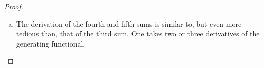 \begin{proof}
\begin{enumerate}[(a)]
{\noindent \emph{Alternate proof 3:} uses the generating functional
\begin{align}\label{eq:INTpowergenfnlexp}
e^{x}+e^{2x}+e^{3x}+\cdots+e^{nx}&=e^{x}\left(1+e^{x}+e^{2x}+e^{3x}+\cdots+e^{(n-1)x}
\right)
\notag\\
&=e^x\frac{e^{nx}-1}{e^x-1}\notag\\
&=\frac{e^{(n+1)x}-e^x}{e^x-1}
\end{align}
by \eqref{eq:INTgeomsum} with $r=e^x$. When we differentiate the
left hand side and then take the limit $x\rightarrow 0$ we get
\begin{align*}
\lim_{x\rightarrow 0}\diff{}{x}\big[e^{x}+e^{2x}+e^{3x}+\cdots+e^{nx}\big]
&=\lim_{x\rightarrow 0}\big[1e^{x}+2e^{2x}+3e^{3x}+\cdots+ne^{nx}\big] \\
&=1+2+3+\cdots+n
\end{align*}
which is exactly the sum that we are trying to evaluate. So, by \eqref{eq:INTpowergenfnl},
\begin{align*}
1+2+3+\cdots+n&=\lim_{x\rightarrow 0}\diff{}{x}\Big[\frac{e^{(n+1)x}-e^x}{e^x-1}\Big]\\
&=\lim_{x\rightarrow 0}
\Big[\frac{((n+1)e^{(n+1)x}-e^x)(e^x-1)-(e^{(n+1)x}-e^x)e^x}{(e^x-1)^2}\Big]\\
&=\lim_{x\rightarrow 0}
\Big[e^x\frac{ne^{(n+1)x}-(n+1)e^{nx}+1}{(e^x-1)^2}\Big]\\
&=\lim_{x\rightarrow 0}
\Big[\frac{ne^{(n+1)x}-(n+1)e^{nx}+1}{(e^x-1)^2}\Big]\\
&=\lim_{x\rightarrow 0}
\Big[\frac{n(n+1)e^{(n+1)x}-n(n+1)e^{nx}}{2(e^x-1)e^x}\Big]\\
&=\lim_{x\rightarrow 0}
\Big[\frac{n(n+1)e^{nx}-n(n+1)e^{(n-1)x}}{2(e^x-1)}\Big]\\
&=\lim_{x\rightarrow 0}
\Big[\frac{n^2(n+1)e^{nx}-n(n+1)(n-1)e^{(n-1)x}}{2 e^x}\Big]\\
&=\frac{n^2(n+1)-n(n+1)(n-1)}{2}\\
&=\frac{(n+1)[n^2-n(n-1)]}{2}\\
&=\frac{n(n+1)}{2}
\end{align*}


}%

\item The derivation of the fourth and fifth sums is similar to, but
even more tedious than, that of the third sum. One takes two or three
derivatives of the generating functional.


\end{enumerate}
\end{proof}
